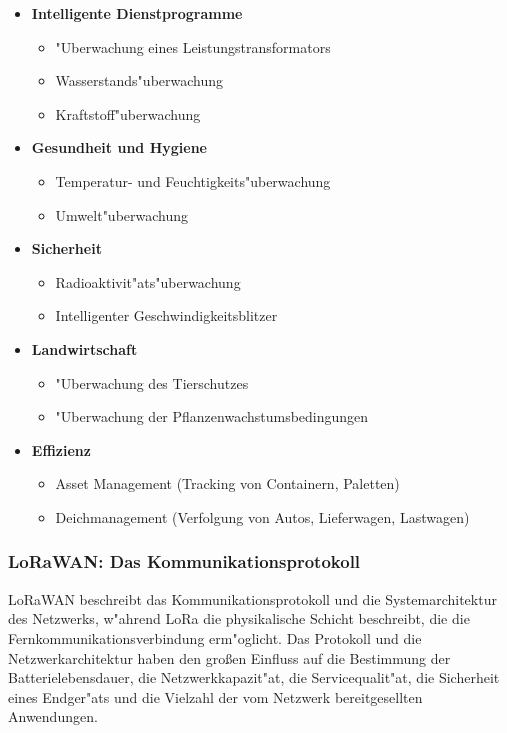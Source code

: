 \begin{itemize}
	\item \textbf{Intelligente Dienstprogramme}
	\begin{itemize}
		\item "Uberwachung eines Leistungstransformators
		\item Wasserstands"uberwachung
		\item Kraftstoff"uberwachung
	\end{itemize}

	\item \textbf{Gesundheit und Hygiene}
	\begin{itemize}
		\item Temperatur- und Feuchtigkeits"uberwachung
		\item Umwelt"uberwachung
	\end{itemize}

	\item \textbf{Sicherheit}
	\begin{itemize}
		\item Radioaktivit"ats"uberwachung
		\item Intelligenter Geschwindigkeitsblitzer
	\end{itemize}

	\item \textbf{Landwirtschaft}
	\begin{itemize}
		\item "Uberwachung des Tierschutzes
		\item "Uberwachung der Pflanzenwachstumsbedingungen
	\end{itemize}
		\item \textbf{Effizienz}
	\begin{itemize}
		\item Asset Management (Tracking von Containern, Paletten)
		\item Deichmanagement (Verfolgung von Autos, Lieferwagen, 
		Lastwagen)
	\end{itemize}
\end{itemize}

\subsubsection{LoRaWAN: Das Kommunikationsprotokoll}\label{protokol}

LoRaWAN beschreibt das Kommunikationsprotokoll und die 
Systemarchitektur des Netzwerks, w"ahrend LoRa die physikalische 
Schicht beschreibt, die die Fernkommunikationsverbindung erm"oglicht. 
Das Protokoll und die Netzwerkarchitektur haben den gro\ss{}en Einfluss 
auf die Bestimmung der Batterielebensdauer, die Netzwerkkapazit"at, die Servicequalit"at, die Sicherheit  eines Endger"ats und die 
Vielzahl der vom Netzwerk bereitgesellten Anwendungen. 

